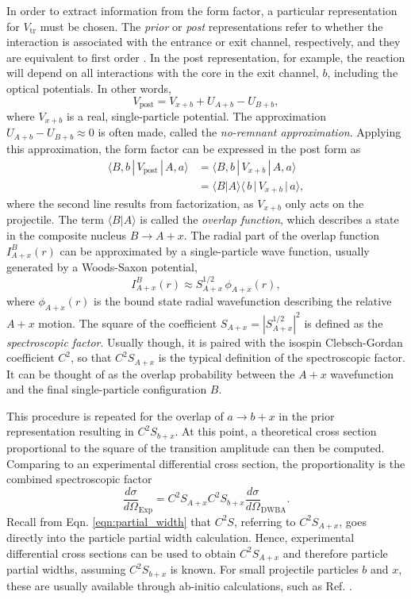 In order to extract information from the form factor, a particular representation for $V_{\mathrm{tr}}$ must be chosen. The \emph{prior} or \emph{post} representations refer to whether the interaction is associated with the entrance or exit channel, respectively, and they are equivalent to first order \cite{Satchler1983}. In the post representation, for example, the reaction will depend on all interactions with the core in the exit channel, $b$, including the optical potentials. In other words,
\begin{equation}
V_{\mathrm{post}} = V_{x+b} + U_{A+b} - U_{B+b},
\end{equation}
where $V_{x+b}$ is a real, single-particle potential. The approximation $U_{A+b} - U_{B+b} \approx 0$ is often made, called the \emph{no-remnant approximation}. Applying this approximation, the form factor can be expressed in the post form as
\begin{align}
\langle B,b \, | \, V_{\mathrm{post}} \, | \, A,a \rangle &= \langle B,b \, | \, V_{x+b} \, | \, A,a \rangle \nonumber \\
&= \langle B|A \rangle \langle \, b \, | \, V_{x+b}\, | \, a \rangle,
\end{align}
where the second line results from factorization, as $V_{x+b}$ only acts on the projectile. The term $\langle B|A \rangle$ is called the \emph{overlap function}, which describes a state in the composite nucleus $B \rightarrow A + x$. The radial part of the overlap function $I^{B}_{A+x}(r)$ can be approximated by a single-particle wave function, usually generated by a Woods-Saxon potential,
\begin{equation}
I^{B}_{A+x}(r) \approx S^{1/2}_{A+x} \, \phi_{A+x}(r),
\end{equation}
where $\phi_{A+x}(r)$ is the bound state radial wavefunction describing the relative $A+x$ motion. The square of the coefficient $S_{A+x} = |S^{1/2}_{A+x}|^{2}$ is defined as the \emph{spectroscopic factor}. Usually though, it is paired with the isospin Clebsch-Gordan coefficient $C^{2}$, so that $C^{2}S_{A+x}$ is the typical definition of the spectroscopic factor. It can be thought of as the overlap probability between the $A+x$ wavefunction and the final single-particle configuration $B$. 

This procedure is repeated for the overlap of $a \rightarrow b + x$ in the prior representation resulting in $C^{2}S_{b+x}$. At this point, a theoretical cross section proportional to the square of the transition amplitude can then be computed. Comparing to an experimental differential cross section, the proportionality is the combined spectroscopic factor
\begin{equation}
\frac{d \sigma}{d \Omega}_{\mathrm{Exp}} = C^{2}S_{A+x}C^{2}S_{b+x} \frac{d \sigma}{d \Omega}_{\mathrm{DWBA}}.
\end{equation}
Recall from Eqn. \ref{eqn:partial_width} that $C^{2}S$, referring to $C^{2}S_{A+x}$, goes directly into the particle partial width calculation. Hence, experimental differential cross sections can be used to obtain $C^{2}S_{A+x}$ and therefore particle partial widths, assuming $C^{2}S_{b+x}$ is known. For small projectile particles $b$ and $x$, these are usually available through ab-initio calculations, such as Ref. \cite{Brida2011}.